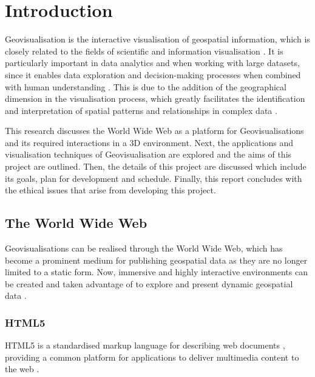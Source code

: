 \documentclass[
	fontsize=11pt
	headlines=2,
	footlines=2,
	parskip=half
]{scrartcl}
\begin{document}
	\section{Introduction} {
	\label{sec:introduction}

		Geovisualisation is the interactive visualisation of geospatial information, which is closely related to the fields of scientific and information visualisation \citep{jiang2005geovisualization}. It is particularly important in data analytics and when working with large datasets, since it enables data exploration and decision-making processes when combined with human understanding \citep{grinstein2002introduction, hendley1995case}. This is due to the addition of the geographical dimension in the visualisation process, which greatly facilitates the identification and interpretation of spatial patterns and relationships in complex data \citep{kwan2004geovisualization}.
		
		This research discusses the World Wide Web as a platform for Geovisualisations and its required interactions in a 3D environment. Next, the applications and visualisation techniques of Geovisualisation are explored and the aims of this project are outlined. Then, the details of this project are discussed which include its goals, plan for development and schedule. Finally, this report concludes with the ethical issues that arise from developing this project.

		\subsection{The World Wide Web} {

			Geovisualisations can be realised through the World Wide Web, which has become a prominent medium for publishing geospatial data as they are no longer limited to a static form. Now, immersive and highly interactive environments can be created and taken advantage of to explore and present dynamic geospatial data \citep{maceachren2001research}.

			\subsubsection{HTML5} {

				HTML5 is a standardised markup language for describing web documents \citep{w3c2014html5}, providing a common platform for applications to deliver multimedia content to the web \citep{lawson2011introducing, chaturvedi2015web}.

}}}
\end{document}
